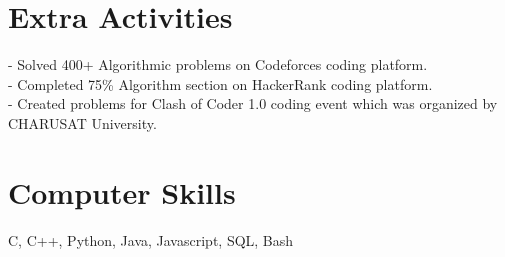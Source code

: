 \documentclass[margin,line]{res}
\begin{document}
\begin{resume}
\section{\sc Extra Activities} 
- Solved 400+ Algorithmic problems on Codeforces coding platform.\\
- Completed 75\% Algorithm section on HackerRank coding platform. \\
- Created problems for Clash of Coder 1.0 coding event which was organized by CHARUSAT University.

\section{\sc Computer Skills} 
C, C++, Python, Java, Javascript, SQL, Bash

\end{resume}
\end{document}
